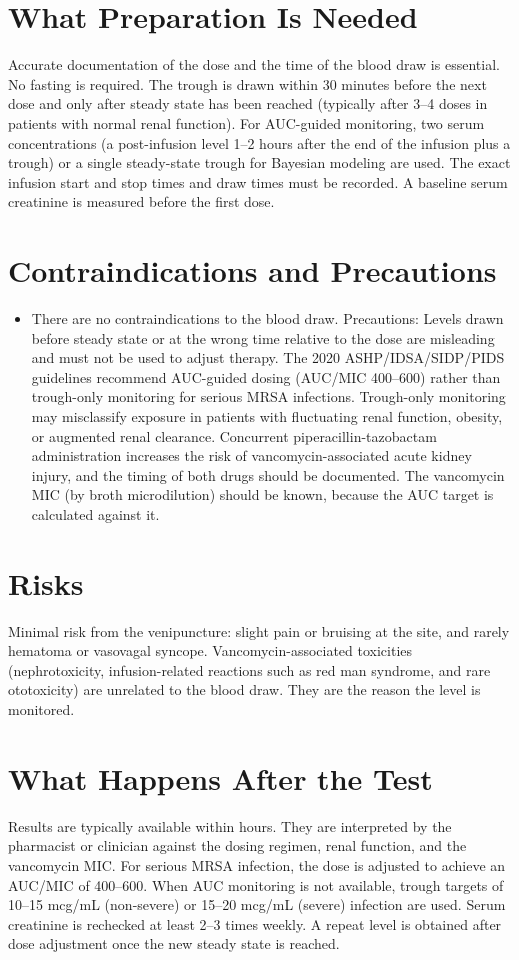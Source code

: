 \section*{What Preparation Is Needed}
Accurate documentation of the dose and the time of the blood draw is essential. No fasting is required. The trough is drawn within 30 minutes before the next dose and only after steady state has been reached (typically after 3--4 doses in patients with normal renal function). For AUC-guided monitoring, two serum concentrations (a post-infusion level 1--2 hours after the end of the infusion plus a trough) or a single steady-state trough for Bayesian modeling are used. The exact infusion start and stop times and draw times must be recorded. A baseline serum creatinine is measured before the first dose.

\section*{Contraindications and Precautions}
\begin{itemize}
  \item There are no contraindications to the blood draw. Precautions: Levels drawn before steady state or at the wrong time relative to the dose are misleading and must not be used to adjust therapy. The 2020 ASHP/IDSA/SIDP/PIDS guidelines recommend AUC-guided dosing (AUC/MIC 400--600) rather than trough-only monitoring for serious MRSA infections. Trough-only monitoring may misclassify exposure in patients with fluctuating renal function, obesity, or augmented renal clearance. Concurrent piperacillin-tazobactam administration increases the risk of vancomycin-associated acute kidney injury, and the timing of both drugs should be documented. The vancomycin MIC (by broth microdilution) should be known, because the AUC target is calculated against it.
\end{itemize}
\section*{Risks}
Minimal risk from the venipuncture: slight pain or bruising at the site, and rarely hematoma or vasovagal syncope. Vancomycin-associated toxicities (nephrotoxicity, infusion-related reactions such as red man syndrome, and rare ototoxicity) are unrelated to the blood draw. They are the reason the level is monitored.

\section*{What Happens After the Test}
Results are typically available within hours. They are interpreted by the pharmacist or clinician against the dosing regimen, renal function, and the vancomycin MIC. For serious MRSA infection, the dose is adjusted to achieve an AUC/MIC of 400--600. When AUC monitoring is not available, trough targets of 10--15 mcg/mL (non-severe) or 15--20 mcg/mL (severe) infection are used. Serum creatinine is rechecked at least 2--3 times weekly. A repeat level is obtained after dose adjustment once the new steady state is reached.

